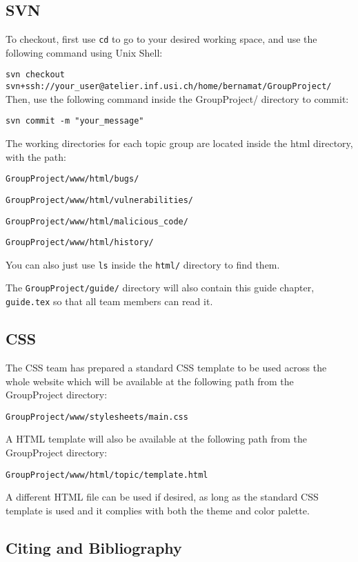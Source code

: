 \documentclass{article}
\begin{document}
\subsection{SVN}
\label{subsubsec:SVN}
To checkout, first use \texttt{cd} to go to your desired working space, and use the following command using Unix Shell: \smallskip

\texttt{svn checkout svn+ssh://your\_user@atelier.inf.usi.ch/home/bernamat/GroupProject/}\smallskip \newline
Then, use the following command inside the GroupProject/ directory to commit: \smallskip

\texttt{svn commit -m "your\_message"}

The working directories for each topic group are located inside the html directory, with the path: \medskip

\texttt{GroupProject/www/html/bugs/}

\texttt{GroupProject/www/html/vulnerabilities/}

\texttt{GroupProject/www/html/malicious\_code/}

\texttt{GroupProject/www/html/history/} \medskip

\noindent You can also just use \texttt {ls} inside the \texttt{html/} directory to find them. \medskip

\noindent The \texttt{GroupProject/guide/} directory will also contain this guide chapter, \texttt{guide.tex} so that all team members can read it.

\subsection{CSS}

The CSS team has prepared a standard CSS template to be used across the whole website which will be available at the following path from the GroupProject directory: \medskip

\texttt{GroupProject/www/stylesheets/main.css} \medskip

\noindent A HTML template will also be available at the following path from the GroupProject directory: \medskip

\texttt{GroupProject/www/html/topic/template.html} \medskip

\noindent A different HTML file can be used if desired, as long as the standard CSS template is used and it complies with both the theme and color palette.

\subsection{Citing and Bibliography}
\label{subsec:bib}
\end{document}
